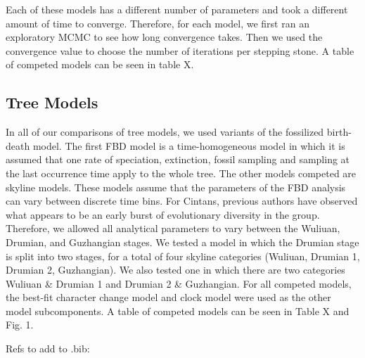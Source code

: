 \documentclass{article}
\begin{document}
Each of these models has a different number of parameters and took a different amount of time to converge. Therefore, for each model, we first ran an exploratory MCMC to see how long convergence takes. Then we used the convergence value to choose the number of iterations per stepping stone.
A table of competed models can be seen in table X.

\subsection{Tree Models}

In all of our comparisons of tree models, we used variants of the fossilized birth-death model.
The first FBD model is a time-homogeneous model in which it is assumed that one rate of speciation, extinction, fossil sampling and sampling at the last occurrence time apply to the whole tree.
The other models competed are skyline models.
These models assume that the parameters of the FBD analysis can vary between discrete time bins.
For Cintans, previous authors have observed what appears to be an early burst of evolutionary diversity in the group.
Therefore, we allowed all analytical parameters to vary between the Wuliuan, Drumian, and Guzhangian stages.
We tested a model in which the Drumian stage is split into two stages, for a total of four skyline categories (Wuliuan, Drumian 1, Drumian 2, Guzhangian).
We also tested one in which there are two categories Wuliuan \& Drumian 1 and Drumian 2 \& Guzhangian. 
For all competed models, the best-fit character change model and clock model were used as the other model subcomponents.
A table of competed models can be seen in Table X and Fig. 1.


Refs to add to .bib:
\end{document}
